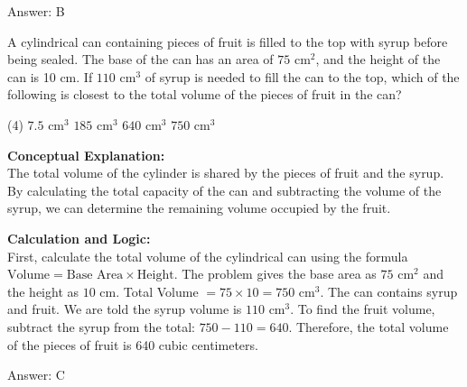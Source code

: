 \documentclass[11pt,paper=a4,answers]{exam}
\begin{document}
\begin{questions}
\begin{solution}
\vspace{30pt}

Answer: \colorbox{yellow!100}{B}
\end{solution}

\vspace{60pt}

\question
A cylindrical can containing pieces of fruit is filled to the top with syrup before being sealed. The base of the can has an area of $75 \text{ cm}^2$, and the height of the can is 10 cm. If $110 \text{ cm}^3$ of syrup is needed to fill the can to the top, which of the following is closest to the total volume of the pieces of fruit in the can?
\begin{tasks}(4)
    \task $7.5 \text{ cm}^3$
    \task $185 \text{ cm}^3$
    \task $640 \text{ cm}^3$
    \task $750 \text{ cm}^3$
    \end{tasks}

\begin{solution}
\textbf{Conceptual Explanation:} \\
The total volume of the cylinder is shared by the pieces of fruit and the syrup. By calculating the total capacity of the can and subtracting the volume of the syrup, we can determine the remaining volume occupied by the fruit.

\vspace{30pt}

\textbf{Calculation and Logic:} \\
First, calculate the total volume of the cylindrical can using the formula $\text{Volume} = \text{Base Area} \times \text{Height}$. The problem gives the base area as $75 \text{ cm}^2$ and the height as $10$ cm. Total Volume $= 75 \times 10 = 750 \text{ cm}^3$. The can contains syrup and fruit. We are told the syrup volume is $110 \text{ cm}^3$. To find the fruit volume, subtract the syrup from the total: $750 - 110 = 640$. Therefore, the total volume of the pieces of fruit is 640 cubic centimeters.

\vspace{30pt}

Answer: \colorbox{yellow!100}{C}
\end{solution}

\vspace{60pt}


\end{questions}
\end{document}
